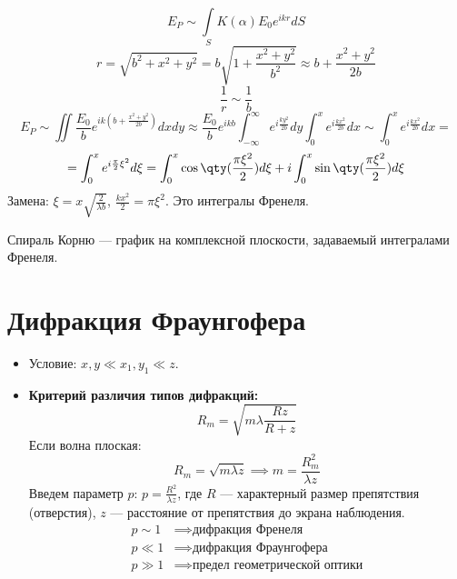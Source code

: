 $$E_P \sim \int\limits_S K(\alpha) E_0 e^{ikr} dS$$
$$r = \sqrt{b^2 + x^2 + y^2} = b\sqrt{1 + \frac{x^2+y^2}{b^2}} \approx b + \frac{x^2+y^2}{2b}$$
$$\frac{1}{r} \sim \frac{1}{b}$$
$$E_P \sim \iint \frac{E_0}{b} e^{ik(b + \frac{x^2+y^2}{2b})} dx dy \approx \frac{E_0}{b} e^{ikb} \int_{-\infty}^{\infty} e^{i \frac{k y^2}{2b}} dy \int_0^x e^{i \frac{k x^2}{2b}} dx \sim \int_0^x e^{i \frac{k x^2}{2b}} dx = $$
$$= \int_0^x e^{i \frac{\pi}{2} \xi^2} d\xi = \int_0^x \cos\qty(\frac{\pi \xi^2}{2}) d\xi + i \int_0^x \sin\qty(\frac{\pi \xi^2}{2}) d\xi$$
Замена: $\xi = x\sqrt{\frac{2}{\lambda b}}$, $\frac{kx^2}{2} = \pi \xi^2$. Это интегралы Френеля.

Спираль Корню — график на комплексной плоскости, задаваемый интегралами Френеля.

\section{Дифракция Фраунгофера}
\begin{itemize}
	\item Условие: $x, y \ll x_1, y_1 \ll z$.
	\item \textbf{Критерий различия типов дифракций:}
	$$R_m = \sqrt{m\lambda \frac{Rz}{R+z}}$$
	Если волна плоская:
	$$R_m = \sqrt{m\lambda z} \implies m = \frac{R_m^2}{\lambda z}$$
	Введем параметр $p$: $p = \frac{R^2}{\lambda z}$, где $R$ — характерный размер препятствия (отверстия), $z$ — расстояние от препятствия до экрана наблюдения.
	\begin{align*}
		p \sim 1 &\implies \text{дифракция Френеля} \\
		p \ll 1 &\implies \text{дифракция Фраунгофера} \\
		p \gg 1 &\implies \text{предел геометрической оптики}
	\end{align*}
\end{itemize}

